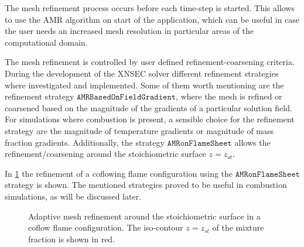 The mesh refinement process occurs before each time-step is started. This allows to use the \Gls{AMR} algorithm on start of the application, which can be useful in case the user needs an increased mesh resolution in particular areas of the computational domain. %
\begin{sloppypar}
The mesh refinement is controlled by user defined refinement-coarsening criteria. During the development of the XNSEC solver different refinement strategies where investigated and implemented. Some of them worth mentioning are the refinement strategy  $\texttt{AMRBasedOnFieldGradient}$, where the mesh is refined or coarsened based on the magnitude of the gradients of a particular solution field. For simulations where combustion is present, a sensible choice for the refinement strategy are the magnitude of temperature gradients or magnitude of mass fraction gradients. Additionally, the strategy $\texttt{AMRonFlameSheet}$ allows the refinement/coarsening around the stoichiometric surface $z = z_{st}$.
\end{sloppypar}
In \cref{fig:CoFlowMeshStrategy} the refinement of a coflowing flame configuration using the $\texttt{AMRonFlameSheet}$ strategy is shown. The mentioned strategies proved to be useful in combustion simulations, as will be discussed later.


\begin{figure}
	\centering
	\pgfplotsset{width=0.50\textwidth, compat=1.3}
	\caption{Adaptive mesh refinement around the stoichiometric surface in a coflow flame configuration. The iso-contour $z = z_{st}$ of the mixture fraction is shown in red.}\label{fig:CoFlowMeshStrategy}
\end{figure}
